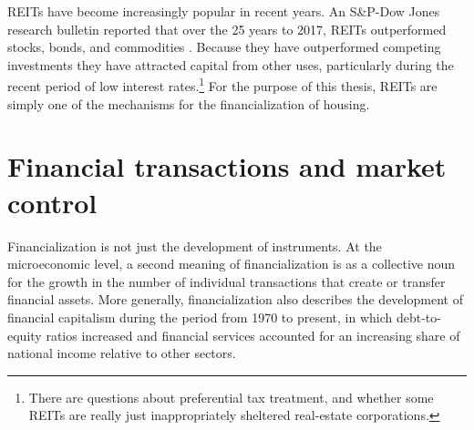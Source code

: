 REITs have become increasingly popular in recent years.  An S\&P-Dow Jones research bulletin reported that over the  25 years to 2017, REITs outperformed stocks, bonds, and commodities \cite{GET-Dow-Jones-research-bulletin}. %
Because they have outperformed competing investments they have attracted  capital from other uses, particularly during the recent period of low interest rates.\footnote{There are questions about preferential tax treatment, and whether some REITs are really just inappropriately sheltered real-estate corporations. } For the purpose of this thesis, REITs are simply one of the mechanisms for the financialization of housing.

\section{Financial transactions and market control}

Financialization is not just the development of instruments. 
At the microeconomic level,  a second meaning of financialization is as a collective noun for the growth in the number of individual transactions that create or transfer financial assets. 
More generally, financialization also describes the development of financial capitalism during the period from 1970 to present, in which debt-to-equity ratios increased and financial services accounted for an increasing share of national income relative to other sectors. %

